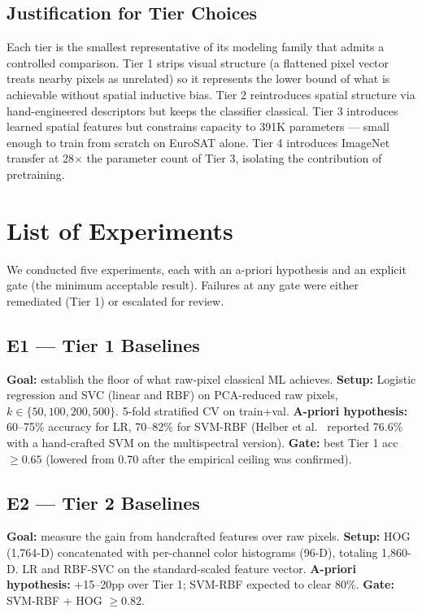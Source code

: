 \documentclass[10pt,letterpaper]{article}
\begin{document}
\subsection{Justification for Tier Choices}
Each tier is the smallest representative of its modeling family that admits a controlled comparison. Tier 1 strips visual structure (a flattened pixel vector treats nearby pixels as unrelated) so it represents the lower bound of what is achievable without spatial inductive bias. Tier 2 reintroduces spatial structure via hand-engineered descriptors but keeps the classifier classical. Tier 3 introduces learned spatial features but constrains capacity to 391K parameters --- small enough to train from scratch on EuroSAT alone. Tier 4 introduces ImageNet transfer at 28$\times$ the parameter count of Tier 3, isolating the contribution of pretraining.

\section{List of Experiments}
\label{sec:experiments}

We conducted five experiments, each with an a-priori hypothesis and an explicit gate (the minimum acceptable result). Failures at any gate were either remediated (Tier 1) or escalated for review.

\subsection{E1 --- Tier 1 Baselines}
\textbf{Goal:} establish the floor of what raw-pixel classical ML achieves.
\textbf{Setup:} Logistic regression and SVC (linear and RBF) on PCA-reduced raw pixels, $k \in \{50, 100, 200, 500\}$. 5-fold stratified CV on train+val.
\textbf{A-priori hypothesis:} 60--75\% accuracy for LR, 70--82\% for SVM-RBF (Helber et al.~\cite{helber2019} reported 76.6\% with a hand-crafted SVM on the multispectral version).
\textbf{Gate:} best Tier 1 acc $\geq 0.65$ (lowered from 0.70 after the empirical ceiling was confirmed).

\subsection{E2 --- Tier 2 Baselines}
\textbf{Goal:} measure the gain from handcrafted features over raw pixels.
\textbf{Setup:} HOG (1{,}764-D) concatenated with per-channel color histograms (96-D), totaling 1{,}860-D. LR and RBF-SVC on the standard-scaled feature vector.
\textbf{A-priori hypothesis:} +15--20pp over Tier 1; SVM-RBF expected to clear 80\%.
\textbf{Gate:} SVM-RBF + HOG $\geq 0.82$.
\end{document}
